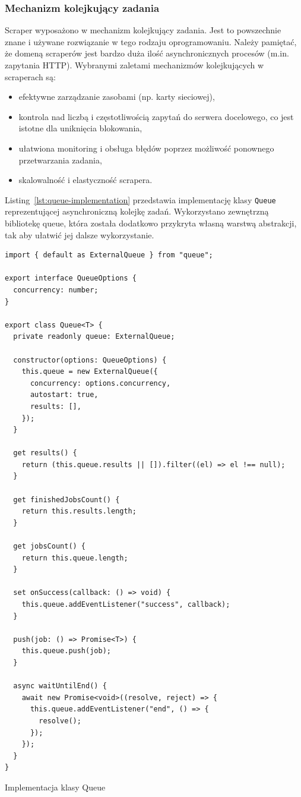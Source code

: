 \subsubsection{Mechanizm kolejkujący zadania}

Scraper wyposażono w mechanizm kolejkujący zadania.
Jest to powszechnie znane i używane rozwiązanie w tego rodzaju oprogramowaniu.
Należy pamiętać, że domeną scraperów jest bardzo duża ilość asynchronicznych procesów (m.in. zapytania HTTP).
Wybranymi zaletami mechanizmów kolejkujących w scraperach są:
\begin{itemize}
    \item efektywne zarządzanie zasobami (np. karty sieciowej),
    \item kontrola nad liczbą i częstotliwością zapytań do serwera docelowego, co jest istotne dla uniknięcia blokowania,
    \item ułatwiona monitoring i obsługa błędów poprzez możliwość ponownego przetwarzania zadania,
    \item skalowalność i elastyczność scrapera.
\end{itemize}
\noindent Listing~\ref{lst:queue-implementation} przedstawia implementację klasy \texttt{Queue} reprezentującej asynchroniczną kolejkę zadań.
Wykorzystano zewnętrzną bibliotekę queue, która została dodatkowo przykryta własną warstwą abstrakcji, tak aby ułatwić jej dalsze wykorzystanie.

\begin{listing}[p]
    \begin{verbatim}
import { default as ExternalQueue } from "queue";

export interface QueueOptions {
  concurrency: number;
}

export class Queue<T> {
  private readonly queue: ExternalQueue;

  constructor(options: QueueOptions) {
    this.queue = new ExternalQueue({
      concurrency: options.concurrency,
      autostart: true,
      results: [],
    });
  }

  get results() {
    return (this.queue.results || []).filter((el) => el !== null);
  }

  get finishedJobsCount() {
    return this.results.length;
  }

  get jobsCount() {
    return this.queue.length;
  }

  set onSuccess(callback: () => void) {
    this.queue.addEventListener("success", callback);
  }

  push(job: () => Promise<T>) {
    this.queue.push(job);
  }

  async waitUntilEnd() {
    await new Promise<void>((resolve, reject) => {
      this.queue.addEventListener("end", () => {
        resolve();
      });
    });
  }
}

    \end{verbatim}
    \caption{Implementacja klasy Queue}
    \label{lst:queue-implementation}
\end{listing}

